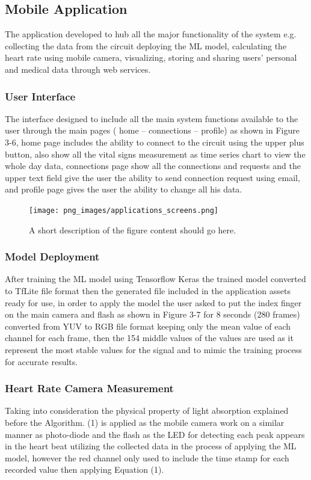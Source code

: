 \documentclass{bmcart}
\begin{document}

\subsection*{Mobile Application}
The application developed to hub all the major functionality of the system e.g.
collecting the data from the circuit deploying the ML model, calculating the
heart rate using mobile camera, visualizing, storing and sharing users' personal
and medical data through web services.
\subsubsection*{User Interface}
The interface designed to include all the main system functions available to the
user through the main pages ( home – connections – profile) as shown in Figure
3-6, home page includes the ability to connect to the circuit using the upper
plus button, also show all the vital signs measurement  as time series chart to
view the whole day  data, connections page show all the connections and requests
and the upper text field give the user the ability  to send connection request
using email, and profile page gives the user the ability to change all his data.
\begin{figure}[h!]
  \texttt{[image: png\_images/applications\_screens.png]}
  \caption{
      A short description of the figure content should go here.}
\end{figure}
\FloatBarrier

\subsubsection*{Model Deployment}
After training the ML model using Tensorflow Keras the trained model converted
to TfLite file format then the generated file included in the application assets
ready for use, in order to apply the model the user asked to put the index
finger on the main camera and flash as shown in Figure 3-7 for 8 seconds (280
frames) converted from YUV to RGB file format keeping only the mean value of
each channel for each frame, then the 154 middle values of the values are used
as it represent the most stable values for the signal and  to mimic the training
process for accurate results.
\subsubsection*{Heart Rate Camera Measurement}
Taking into consideration the physical property of light absorption explained
before the Algorithm. (1)  is applied as the mobile camera work on a similar
manner as photo-diode and the flash as the LED for detecting each peak appears
in the heart beat utilizing the collected data in the process of applying the ML
model, however the red channel only used to include the time stamp for each
recorded value then applying Equation (1). 
\end{document}
